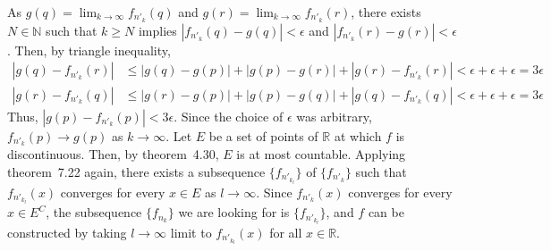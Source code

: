 \documentclass{scrartcl}
\begin{document}
As \(g(q) = \lim_{k \to \infty} f_{n'_k}(q)\) and \(g(r) = \lim_{k \to \infty}
f_{n'_k}(r)\), there exists \(N \in \mathbb{N}\) such that \(k \ge N\) implies
\(|f_{n'_k}(q) - g(q)| < \epsilon\) and \(|f_{n'_k}(r) - g(r)| < \epsilon\).
Then, by triangle inequality,
\begin{align*}
  |g(q) - f_{n'_k}(r)|
  &\le |g(q) - g(p)| + |g(p) - g(r)| + |g(r) - f_{n'_k}(r)|
  < \epsilon + \epsilon + \epsilon
  = 3\epsilon \\
  |g(r) - f_{n'_k}(q)|
  &\le |g(r) - g(p)| + |g(p) - g(q)| + |g(q) - f_{n'_k}(q)|
  < \epsilon + \epsilon + \epsilon
  = 3\epsilon
\end{align*}
Thus, \(|g(p) - f_{n'_k}(p)| < 3\epsilon\). Since the choice of \(\epsilon\)
was arbitrary, \(f_{n'_k}(p) \to g(p)\) as \(k \to \infty\). Let \(E\) be a set
of points of \(\mathbb{R}\) at which \(f\) is discontinuous. Then, by
theorem~4.30, \(E\) is at most countable. Applying theorem~7.22 again, there
exists a subsequence \(\{f_{n'_{k_l}}\}\) of \(\{f_{n'_k}\}\) such that
\(f_{n'_{k_l}}(x)\) converges for every \(x \in E\) as \(l \to \infty\). Since
\(f_{n'_k}(x)\) converges for every \(x \in E^C\), the subsequence
\(\{f_{n_k}\}\) we are looking for is \(\{f_{n'_{k_l}}\}\), and \(f\) can be
constructed by taking \(l \to \infty\) limit to \(f_{n'_{k_l}}(x)\) for all \(x
\in \mathbb{R}\).
\end{document}
